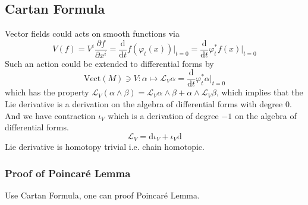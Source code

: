 \documentclass[10pt]{article}
\begin{document}
\subsection{Cartan Formula}

Vector fields could acts on smooth functions via
\begin{equation*}
  V(f) = V^{i} \frac{\partial f}{\partial x^{i}} = \frac{\mathrm{d} }{\mathrm{d} t} f(\varphi_{t}(x)) \bigg|_{t=0} = \frac{\mathrm{d} }{\mathrm{d} t} \varphi_{t}^{*} f(x) \bigg|_{t=0}
\end{equation*}
Such an action could be extended to differential forms by
\begin{equation*}
  \mathrm{Vect}(M) \ni V : \alpha \mapsto \mathcal{L}_{V} \alpha = \frac{\mathrm{d} }{\mathrm{d} t} \varphi_{t}^{*} \alpha \bigg|_{t=0}
\end{equation*}
which has the property $ \mathcal{L}_{V}(\alpha \wedge \beta) = \mathcal{L}_{V} \alpha \wedge \beta + \alpha \wedge \mathcal{L}_{V} \beta$, which implies that the Lie derivative is a derivation on the algebra of differential forms with degree $ 0$. And we have contraction $ \iota_{V}$ which is a derivation of degree $ -1$ on the algebra of differential forms.
\begin{equation*}
  \mathcal{L}_{V}  = \mathrm{d} \iota_{V} + \iota_{V} \mathrm{d}
\end{equation*}
Lie derivative is homotopy trivial i.e. chain homotopic.

\subsubsection{Proof of Poincaré Lemma}
Use Cartan Formula, one can proof Poincaré Lemma.
\end{document}
